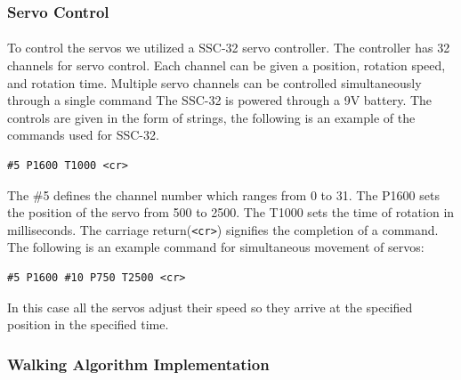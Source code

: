 \documentclass[titlepage,letterpaper,12pt]{article}
\begin{document}
\subsubsection{Servo Control}
\paragraph{}To control the servos we utilized a SSC-32 servo controller. The
controller has 32 channels for servo control. Each channel can be given a
position, rotation speed, and rotation time. Multiple servo channels can be
controlled simultaneously through a single command The SSC-32 is powered through
a 9V battery. The controls are given in the form of strings, the following is an
example of the commands used for SSC-32.
\begin{verbatim}
#5 P1600 T1000 <cr>
\end{verbatim}
The \#5 defines the channel number which ranges from 0 to 31. The P1600 sets the
position of the servo from 500 to 2500. The T1000 sets the time of rotation in
milliseconds. The carriage return(\verb!<cr>!) signifies the completion of a
command. The following is an example command for simultaneous movement of
servos:
\begin{verbatim}
#5 P1600 #10 P750 T2500 <cr>
\end{verbatim}
In this case all the servos adjust their speed so they arrive at the specified
position in the specified time.

\subsubsection{Walking Algorithm Implementation}
\end{document}

